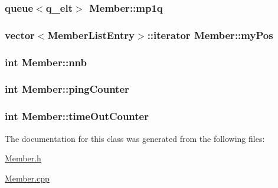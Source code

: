 \hypertarget{class_member_a62f45dfeaee8e141c328149f6c36efe2}{
\subsubsection[{mp1q}]{\setlength{\rightskip}{0pt plus 5cm}queue$<${\bf q\-\_\-elt}$>$ {\bf \-Member\-::mp1q}}}\label{df/dbc/class_member_a62f45dfeaee8e141c328149f6c36efe2}
\hypertarget{class_member_a50bf6051866f7968484600b98d784303}{
\subsubsection[{my\-Pos}]{\setlength{\rightskip}{0pt plus 5cm}vector$<${\bf \-Member\-List\-Entry}$>$\-::iterator {\bf \-Member\-::my\-Pos}}}\label{df/dbc/class_member_a50bf6051866f7968484600b98d784303}
\hypertarget{class_member_a74c51884e3d80e38ef3c25e8c111cd9b}{
\subsubsection[{nnb}]{\setlength{\rightskip}{0pt plus 5cm}int {\bf \-Member\-::nnb}}}\label{df/dbc/class_member_a74c51884e3d80e38ef3c25e8c111cd9b}
\hypertarget{class_member_abc5127f9400138b743b8bc437758611a}{
\subsubsection[{ping\-Counter}]{\setlength{\rightskip}{0pt plus 5cm}int {\bf \-Member\-::ping\-Counter}}}\label{df/dbc/class_member_abc5127f9400138b743b8bc437758611a}
\hypertarget{class_member_a30c6e44397b58f19f28383e2d454f6ad}{
\subsubsection[{time\-Out\-Counter}]{\setlength{\rightskip}{0pt plus 5cm}int {\bf \-Member\-::time\-Out\-Counter}}}\label{df/dbc/class_member_a30c6e44397b58f19f28383e2d454f6ad}


\-The documentation for this class was generated from the following files\-:\begin{DoxyCompactItemize}
\item 
\hyperlink{_member_8h}{\-Member.\-h}\item 
\hyperlink{_member_8cpp}{\-Member.\-cpp}\end{DoxyCompactItemize}
